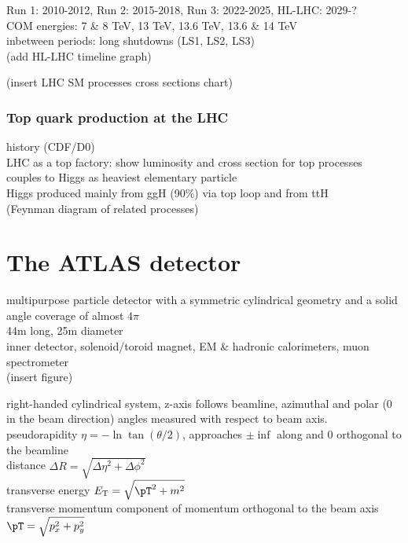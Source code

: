 \documentclass[../thesis.tex]{subfiles}
\begin{document}
Run 1: 2010-2012, Run 2: 2015-2018, Run 3: 2022-2025, HL-LHC: 2029-?\\
COM energies: 7 \& 8 TeV, 13 TeV, 13.6 TeV, 13.6 \& 14 TeV\\
inbetween periods: long shutdowns (LS1, LS2, LS3)\\
(add HL-LHC timeline graph)


(insert LHC SM processes cross sections chart)
\subsubsection*{Top quark production at the LHC}
history (CDF/D0)\\
LHC as a top factory: show luminosity and cross section for top processes\\
couples to Higgs as heaviest elementary particle\\
Higgs produced mainly from ggH (90\%) via top loop and from ttH\\
(Feynman diagram of related processes)


\section{The ATLAS detector}
\label{sec:ATLAS}
multipurpose particle detector with a symmetric cylindrical geometry and a solid angle coverage of almost $4\pi$\\
44m long, 25m diameter\\
inner detector, solenoid/toroid magnet, EM \& hadronic calorimeters, muon spectrometer\\
(insert figure)


right-handed cylindrical system, z-axis follows beamline, azimuthal and polar (0 in the beam direction) angles measured with respect to beam axis.\\
pseudorapidity $\eta = -\ln \tan (\theta/2)$, approaches $\pm\inf$ along and 0 orthogonal to the beamline\\
distance $\Delta R=\sqrt{\Delta \eta^2 + \Delta \phi^2}$\\
transverse energy $E_\text{T}=\sqrt{\pT ^2+m^2}$\\
transverse momentum \pT component of momentum orthogonal to the beam axis $\pT = \sqrt{p_x^2 + p_y^2}$
\end{document}
